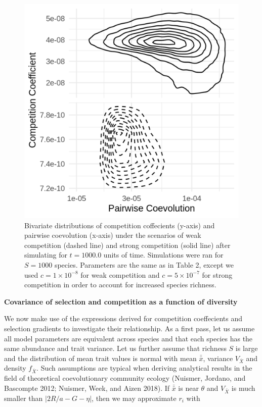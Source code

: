 \documentclass[]{article}
\begin{document}
\begin{figure}

{\centering \includegraphics{on_pl} 

}

\caption{\label{net}Bivariate distributions of competition coffecients (y-axis) and pairwise coevolution (x-axis) under the scenarios of weak competition (dashed line) and strong competition (solid line) after simulating for $t=1000.0$ units of time. Simulations were ran for $S=1000$ species. Parameters are the same as in Table 2, except we used $c=1\times 10^{-8}$ for weak competition and $c=5\times 10^{-7}$ for strong competition in order to account for increased species richness.}\label{fig:unnamed-chunk-8}
\end{figure}

\textbf{Covariance of selection and competition as a function of
diversity}

We now make use of the expressions derived for competition coeffecients
and selection gradients to investigate their relationship. As a first
pass, let us assume all model parameters are equivalent across species
and that each species has the same abundance and trait variance. Let us
further assume that richness \(S\) is large and the distribution of mean
trait values is normal with mean \(\bar{\bar x}\), variance
\(V_{\bar X}\) and density \(f_{\bar X}\). Such assumptions are typical
when deriving analytical results in the field of theoretical
coevolutionary community ecology (Nuismer, Jordano, and Bascompte 2012;
Nuismer, Week, and Aizen 2018). If \(\bar{\bar x}\) is near \(\theta\)
and \(V_{\bar X}\) is much smaller than \(|2R/a-G-\eta|\), then we may
approximate \(r_i\) with
\end{document}
